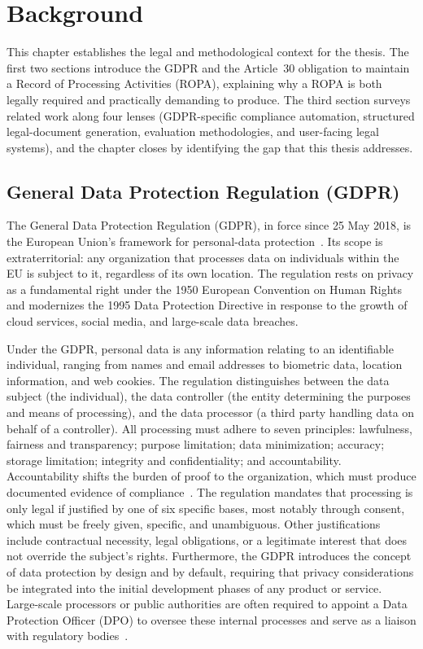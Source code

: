 \chapter{Background}
\label{ch:background}

This chapter establishes the legal and methodological context for
the thesis. The first two sections introduce the GDPR and the
Article~30 obligation to maintain a Record of Processing
Activities (ROPA), explaining why a ROPA is both legally required
and practically demanding to produce. The third section surveys
related work along four lenses (GDPR-specific compliance
automation, structured legal-document generation, evaluation
methodologies, and user-facing legal systems), and the chapter
closes by identifying the gap that this thesis addresses.

\bigskip
\section{General Data Protection Regulation (GDPR)}

The General Data Protection Regulation (GDPR), in force since 25 May 2018, is the European Union's framework for personal-data protection~\cite{gdpr-eu-overview}. Its scope is extraterritorial: any organization that processes data on individuals within the EU is subject to it, regardless of its own location. The regulation rests on privacy as a fundamental right under the 1950 European Convention on Human Rights and modernizes the 1995 Data Protection Directive in response to the growth of cloud services, social media, and large-scale data breaches.~\cite{gdpr-eu-overview, gdpr-info-art30}

Under the GDPR, personal data is any information relating to an identifiable individual, ranging from names and email addresses to biometric data, location information, and web cookies. The regulation distinguishes between the data subject (the individual), the data controller (the entity determining the purposes and means of processing), and the data processor (a third party handling data on behalf of a controller). All processing must adhere to seven principles: lawfulness, fairness and transparency; purpose limitation; data minimization; accuracy; storage limitation; integrity and confidentiality; and accountability. Accountability shifts the burden of proof to the organization, which must produce documented evidence of compliance~\cite{gdpr-eu-overview}.
The regulation mandates that processing is only legal if justified by one of six specific bases, most notably through consent, which must be freely given, specific, and unambiguous. Other justifications include contractual necessity, legal obligations, or a legitimate interest that does not override the subject's rights. Furthermore, the GDPR introduces the concept of data protection by design and by default, requiring that privacy considerations be integrated into the initial development phases of any product or service. Large-scale processors or public authorities are often required to appoint a Data Protection Officer (DPO) to oversee these internal processes and serve as a liaison with regulatory bodies~\cite{gdpr-eu-overview}.

